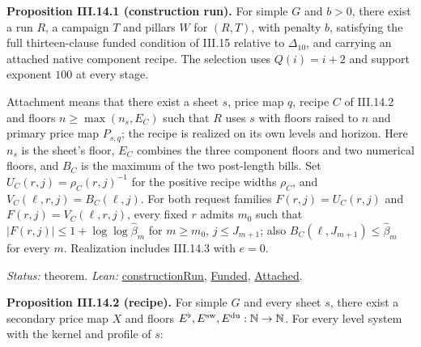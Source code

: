 \documentclass[
  letterpaper,
  11pt]{article}
\begin{document}
\textbf{Proposition III.14.1 (construction run).} For simple \(G\) and
\(b>0\), there exist a run \(R\), a campaign \(T\) and pillars \(W\) for
\((R,T)\), with penalty \(b\), satisfying the full thirteen-clause
funded condition of III.15 relative to \(\Delta_{10}\), and carrying an
attached native component recipe. The selection uses \(Q(i)=i+2\) and
support exponent \(100\) at every stage.

Attachment means that there exist a sheet \(s\), price map \(q\), recipe
\(C\) of III.14.2 and floors \(n\ge\max(n_s,E_C)\) such that \(R\) uses
\(s\) with floors raised to \(n\) and primary price map \(P_{s,q}\); the
recipe is realized on its own levels and horizon. Here \(n_s\) is the
sheet's floor, \(E_C\) combines the three component floors and two
numerical floors, and \(B_C\) is the maximum of the two post-length
bills. Set \(U_C(r,j)=\rho_C(r,j)^{-1}\) for the positive recipe widths
\(\rho_C\), and \(V_C(\ell,r,j)=B_C(\ell,j)\). For both request families
\(F(r,j)=U_C(r,j)\) and \(F(r,j)=V_C(\ell,r,j)\), every fixed \(r\)
admits \(m_0\) such that \(|F(r,j)|\le1+\log\log\hat\beta_m\) for
\(m\ge m_0\), \(j\le J_{m+1}\); also \(B_C(\ell,J_{m+1})\le\hat\beta_m\)
for every \(m\). Realization includes III.14.3 with \(e=0\).

\emph{Status:} theorem. \emph{Lean:}
\href{https://github.com/yang-mills-group/OpenAI-YM-20261028/blob/3456e5e75cf8d4cd558955a5c7638fba2d68f464/YM/Independent/ConstructionRun.lean\#L14-L28}{constructionRun},
\href{https://github.com/yang-mills-group/OpenAI-YM-20261028/blob/3456e5e75cf8d4cd558955a5c7638fba2d68f464/YM/R2I/Campaign/Accepted.lean\#L60-L73}{Funded},
\href{https://github.com/yang-mills-group/OpenAI-YM-20261028/blob/3456e5e75cf8d4cd558955a5c7638fba2d68f464/YM/Integration/ActualRunNativeComponentRecipe.lean\#L56-L69}{Attached}.

\textbf{Proposition III.14.2 (recipe).} For simple \(G\) and every sheet
\(s\), there exist a secondary price map \(X\) and floors
\(E^\flat,E^{\rm sw},E^{\rm du}:\mathbb N\to\mathbb N\). For every level
system with the kernel and profile of \(s\):
\end{document}
